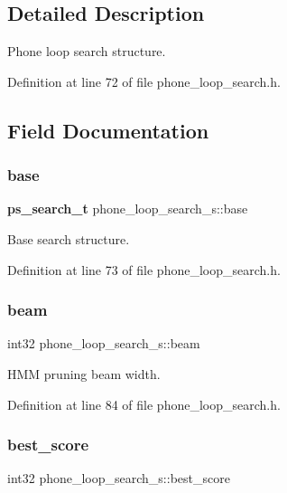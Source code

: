 \subsection{Detailed Description}
Phone loop search structure. 

Definition at line 72 of file phone\+\_\+loop\+\_\+search.\+h.



\subsection{Field Documentation}
\mbox{\label{structphone__loop__search__s_aea1cf9ffda814f681b57f32c1f8cc3b1}} 
\subsubsection{base}
{\footnotesize\ttfamily \textbf{ ps\+\_\+search\+\_\+t} phone\+\_\+loop\+\_\+search\+\_\+s\+::base}



Base search structure. 



Definition at line 73 of file phone\+\_\+loop\+\_\+search.\+h.

\mbox{\label{structphone__loop__search__s_a1aa6103c72ce8159bd21bfa4f97feff3}} 
\subsubsection{beam}
{\footnotesize\ttfamily int32 phone\+\_\+loop\+\_\+search\+\_\+s\+::beam}



H\+MM pruning beam width. 



Definition at line 84 of file phone\+\_\+loop\+\_\+search.\+h.

\mbox{\label{structphone__loop__search__s_af6bf0231db2587a3f7ffa3f838b84db5}} 
\subsubsection{best\+\_\+score}
{\footnotesize\ttfamily int32 phone\+\_\+loop\+\_\+search\+\_\+s\+::best\+\_\+score}



